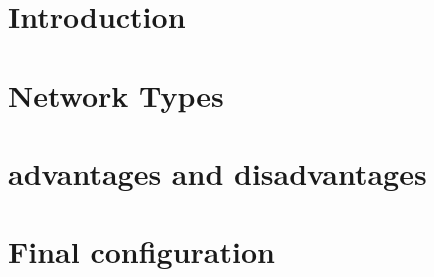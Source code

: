 \section{Introduction}

\section{Network Types}

\section{advantages and disadvantages}

\section{Final configuration}